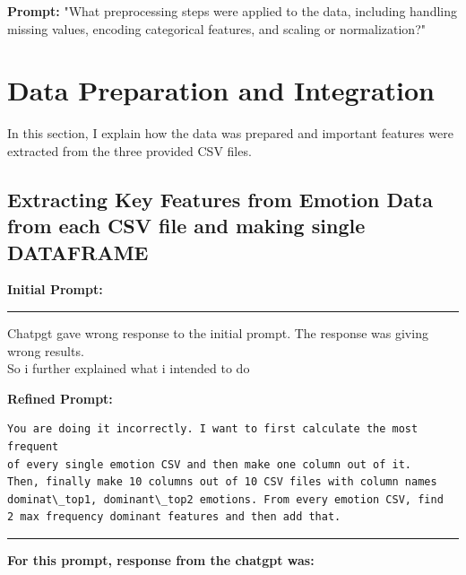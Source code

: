 \documentclass[11pt,a4paper]{article}
\begin{document}
\textbf{Prompt:} "What preprocessing steps were applied to the data, including handling missing values, encoding categorical features, and scaling or normalization?"


\newpage
\section{Data Preparation and Integration}
\label{sec:data-prep}

In this section, I explain how the data was prepared and important features were extracted from the three provided CSV files.

\subsection{Extracting Key Features from Emotion Data from each CSV file and making single DATAFRAME}
\textbf{Initial Prompt:}
\begin{tcolorbox}[breakable, colback=gray!5, colframe=gray!50!black]

\end{tcolorbox}
\begin{center}
    \color{red}\rule{1\linewidth}{0.5mm}
\end{center}


\begin{responsebox}
    Chatpgt gave wrong response to the initial prompt. The response was giving wrong results.\\
    So i further explained what i intended to do
\end{responsebox}
   



\textbf{Refined Prompt:}
\begin{verbatim}
You are doing it incorrectly. I want to first calculate the most frequent 
of every single emotion CSV and then make one column out of it. 
Then, finally make 10 columns out of 10 CSV files with column names 
dominat\_top1, dominant\_top2 emotions. From every emotion CSV, find 
2 max frequency dominant features and then add that.
\end{verbatim}
\begin{center}
    \color{red}\rule{1\linewidth}{0.5mm}
\end{center}


\textbf{For this prompt, response from the chatgpt was:}
\begin{tcolorbox}[breakable, colback=gray!5, colframe=gray!50!black]

\end{tcolorbox}
\end{document}

